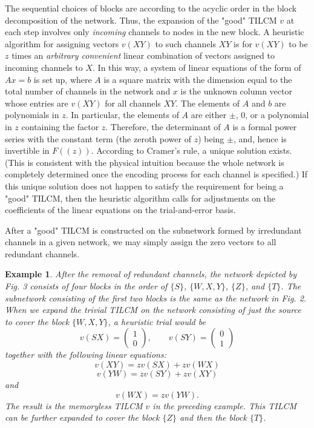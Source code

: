 \documentclass[journal]{IEEEtran}
\newtheorem{exam}[prop]{Example}
\begin{document}
The sequential choices of blocks are according to the acyclic order in the block decomposition of the network. Thus, the expansion of the "good" TILCM $v$ at each step involves only \emph{incoming} channels to nodes in the new block. A heuristic algorithm for assigning vectors $v(XY)$ to such channels $XY$ is for $v(XY)$ to be $z$ times an \emph{arbitrary convenient} linear combination of vectors assigned to incoming channels to $X$. In this way, a system of linear equations of the form of $Ax=b$ is set up, where $A$ is a square matrix with the dimension equal to the total number of channels in the network and $x$ is the unknown column vector whose entries are $v(XY)$ for all channels $XY$. The elements of $A$ and $b$ are polynomials in $z$. In particular, the elements of $A$ are either $\pm$, 0, or a polynomial in $z$ containing the factor $z$. Therefore, the determinant of $A$ is a formal power series with the constant term (the zeroth power of $z$) being $\pm$, and, hence is invertible in $F((z))$. According to Cramer’s rule, a unique solution exists. (This is consistent with the physical intuition because the whole network is completely determined once the encoding process for each channel is specified.) If this unique solution does not happen to satisfy the requirement for being a "good" TILCM, then the heuristic algorithm calls for adjustments on the coefficients of the linear equations on the trial-and-error basis.
\par
After a "good" TILCM is constructed on the subnetwork formed by irredundant channels in a given network, we may simply assign the zero vectors to all redundant channels.
\begin{exam}
	After the removal of redundant channels, the network depicted by Fig. 3 consists of four blocks in the order of $\{S\}$, $\{W,X,Y\}$, $\{Z\}$, and $\{T\}$. The subnetwork consisting of the first two blocks is the same as the network in Fig. 2. When we expand the trivial TILCM on the network consisting of just the source to cover the block $\{W,X,Y\}$, a heuristic trial would be
	$$v(SX)=\begin{pmatrix}	1\\ 0 \end{pmatrix},\qquad v(SY)=\begin{pmatrix}	0\\ 1 \end{pmatrix}$$
	together with the following linear equations:
	$$v(XY)=zv(SX)+zv(WX)$$
	$$v(YW)=zv(SY)+zv(XY)$$
	and
	$$v(WX)=zv(YW).$$
	The result is the memoryless TILCM $v$ in the preceding example. This TILCM can be further expanded to cover the block $\{Z\}$ and then the block $\{T\}$.
\end{exam}
\end{document}
